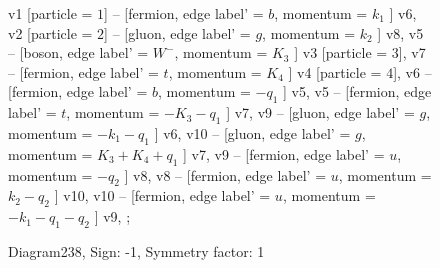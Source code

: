 \documentclass{revtex4}
\begin{document}
\begin{figure}[!htb]
\begin{center}
{    %
v1 [particle = \(1\)] -- [fermion, edge label' = \(b\), momentum = \(k_{1}\) ] v6, 
v2 [particle = \(2\)] -- [gluon, edge label' = \(g\), momentum = \(k_{2}\) ] v8, 
v5 -- [boson, edge label' = \(W^{-}\), momentum = \(K_{3}\) ] v3 [particle = \(3\)], 
v7 -- [fermion, edge label' = \(t\), momentum = \(K_{4}\) ] v4 [particle = \(4\)], 
v6 -- [fermion, edge label' = \(b\), momentum = \(-q_{1}\) ] v5, 
v5 -- [fermion, edge label' = \(t\), momentum = \(-K_{3} - q_{1}\) ] v7, 
v9 -- [gluon, edge label' = \(g\), momentum = \(-k_{1} - q_{1}\) ] v6, 
v10 -- [gluon, edge label' = \(g\), momentum = \(K_{3} + K_{4} + q_{1}\) ] v7, 
v9 -- [fermion, edge label' = \(u\), momentum = \(-q_{2}\) ] v8, 
v8 -- [fermion, edge label' = \(u\), momentum = \(k_{2} - q_{2}\) ] v10, 
v10 -- [fermion, edge label' = \(u\), momentum = \(-k_{1} - q_{1} - q_{2}\) ] v9, 
};
\end{center}
\caption{Diagram238, Sign: -1, Symmetry factor: 1}
\end{figure}
\newpage
\end{document}
